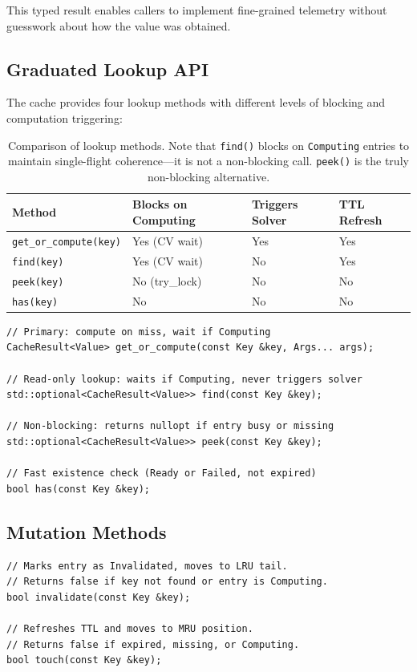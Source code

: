 \documentclass[11pt,a4paper]{article}
\begin{document}
This typed result enables callers to implement fine-grained telemetry
without guesswork about how the value was obtained.

\subsection{Graduated Lookup API}

The cache provides four lookup methods with different levels of blocking
and computation triggering:

\begin{table}[htbp]
\centering
\begin{tabular}{@{}llll@{}}
\toprule
Method & Blocks on Computing & Triggers Solver & TTL Refresh \\
\midrule
\texttt{get\_or\_compute(key)} & Yes (CV wait) & Yes & Yes \\
\texttt{find(key)} & Yes (CV wait) & No & Yes \\
\texttt{peek(key)} & No (try\_lock) & No & No \\
\texttt{has(key)} & No & No & No \\
\bottomrule
\end{tabular}
\caption{Comparison of lookup methods.  Note that \texttt{find()} blocks
         on \texttt{Computing} entries to maintain single-flight
         coherence---it is not a non-blocking call.  \texttt{peek()} is
         the truly non-blocking alternative.}
\label{tab:lookup-api}
\end{table}

\begin{lstlisting}[caption=Lookup API signatures]
// Primary: compute on miss, wait if Computing
CacheResult<Value> get_or_compute(const Key &key, Args... args);

// Read-only lookup: waits if Computing, never triggers solver
std::optional<CacheResult<Value>> find(const Key &key);

// Non-blocking: returns nullopt if entry busy or missing
std::optional<CacheResult<Value>> peek(const Key &key);

// Fast existence check (Ready or Failed, not expired)
bool has(const Key &key);
\end{lstlisting}

\subsection{Mutation Methods}

\begin{lstlisting}[caption=Mutation API]
// Marks entry as Invalidated, moves to LRU tail.
// Returns false if key not found or entry is Computing.
bool invalidate(const Key &key);

// Refreshes TTL and moves to MRU position.
// Returns false if expired, missing, or Computing.
bool touch(const Key &key);
\end{lstlisting}
\end{document}

